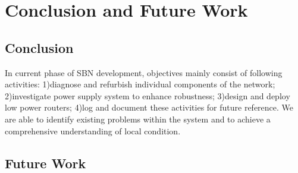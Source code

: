 \chapter{Conclusion and Future Work}
\section{Conclusion}
In current phase of SBN development, objectives mainly consist of following activities: 1)diagnose and refurbish individual components of the network; 2)investigate power supply system to enhance robustness; 3)design and deploy low power routers; 4)log and document these activities for future reference. We are able to identify existing problems within the system and to achieve a comprehensive understanding of local condition.
\section{Future Work}
